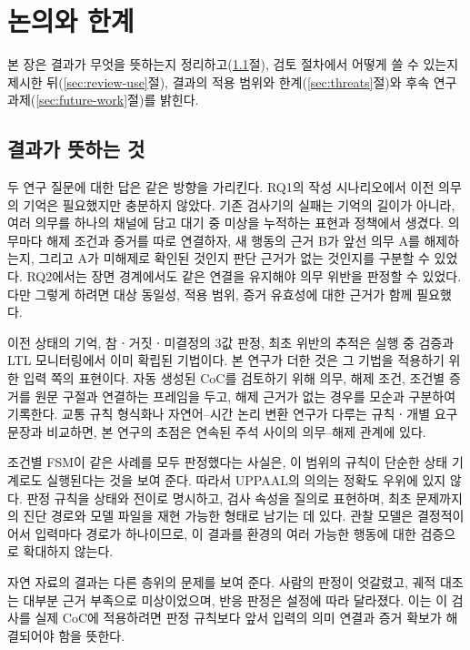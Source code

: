 \section{논의와 한계}
\label{sec:discussion}

\begin{revision}

본 장은 결과가 무엇을 뜻하는지 정리하고(\ref{sec:discussion-results}절), 검토 절차에서 어떻게 쓸 수 있는지 제시한 뒤(\ref{sec:review-use}절), 결과의 적용 범위와 한계(\ref{sec:threats}절)와 후속 연구 과제(\ref{sec:future-work}절)를 밝힌다.

\subsection{결과가 뜻하는 것}
\label{sec:discussion-results}
두 연구 질문에 대한 답은 같은 방향을 가리킨다. RQ1의 작성 시나리오에서 이전 의무의 기억은 필요했지만 충분하지 않았다. 기존 검사기의 실패는 기억의 길이가 아니라, 여러 의무를 하나의 채널에 담고 대기 중 미상을 누적하는 표현과 정책에서 생겼다. 의무마다 해제 조건과 증거를 따로 연결하자, 새 행동의 근거 B가 앞선 의무 A를 해제하는지, 그리고 A가 미해제로 확인된 것인지 판단 근거가 없는 것인지를 구분할 수 있었다. RQ2에서는 장면 경계에서도 같은 연결을 유지해야 의무 위반을 판정할 수 있었다. 다만 그렇게 하려면 대상 동일성, 적용 범위, 증거 유효성에 대한 근거가 함께 필요했다.

이전 상태의 기억, 참ㆍ거짓ㆍ미결정의 3값 판정, 최초 위반의 추적은 실행 중 검증과 LTL 모니터링에서 이미 확립된 기법이다\cite{leucker2009runtime,bauer2011runtime}. 본 연구가 더한 것은 그 기법을 적용하기 위한 입력 쪽의 표현이다. 자동 생성된 CoC를 검토하기 위해 의무, 해제 조건, 조건별 증거를 원문 구절과 연결하는 프레임을 두고, 해제 근거가 없는 경우를 모순과 구분하여 기록한다. 교통 규칙 형식화나 자연어--시간 논리 변환 연구가 다루는 규칙ㆍ개별 요구 문장과 비교하면, 본 연구의 초점은 연속된 주석 사이의 의무--해제 관계에 있다.

조건별 FSM이 같은 사례를 모두 판정했다는 사실은, 이 범위의 규칙이 단순한 상태 기계로도 실행된다는 것을 보여 준다. 따라서 UPPAAL의 의의는 정확도 우위에 있지 않다. 판정 규칙을 상태와 전이로 명시하고, 검사 속성을 질의로 표현하며, 최초 문제까지의 진단 경로와 모델 파일을 재현 가능한 형태로 남기는 데 있다. 관찰 모델은 결정적이어서 입력마다 경로가 하나이므로, 이 결과를 환경의 여러 가능한 행동에 대한 검증으로 확대하지 않는다.

자연 자료의 결과는 다른 층위의 문제를 보여 준다. 사람의 판정이 엇갈렸고, 궤적 대조는 대부분 근거 부족으로 미상이었으며, 반응 판정은 설정에 따라 달라졌다. 이는 이 검사를 실제 CoC에 적용하려면 판정 규칙보다 앞서 입력의 의미 연결과 증거 확보가 해결되어야 함을 뜻한다.


\end{revision}
